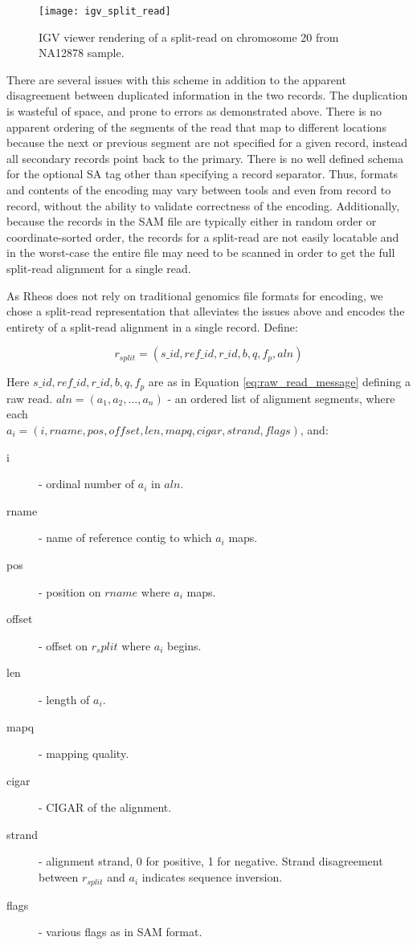\begin{figure}[H]
    \texttt{[image: igv\_split\_read]}
    \centering
    \caption {IGV viewer rendering of a split-read on chromosome 20 from NA12878 sample.}
    \label{fig:igv_split_read}
\end{figure}

There are several issues with this scheme in addition to the apparent disagreement between duplicated information in the two records. The duplication is wasteful of space, and prone to errors as demonstrated above. There is no apparent ordering of the segments of the read that map to different locations because the next or previous segment are not specified for a given record, instead all secondary records point back to the primary. There is no well defined schema for the optional SA tag other than specifying a record separator. Thus, formats and contents of the encoding may vary between tools and even from record to record, without the ability to validate correctness of the encoding. Additionally, because the records in the SAM file are typically either in random order or coordinate-sorted order, the records for a split-read are not easily locatable and in the worst-case the entire file may need to be scanned in order to get the full split-read alignment for a single read. 

As Rheos does not rely on traditional genomics file formats for encoding, we chose a split-read representation that alleviates the issues above and encodes the entirety of a split-read alignment in a single record. Define:

\begin{equation}
    \label{eq:split_read}
    r_{split} = (s\_id, ref\_id, r\_id, b, q, f_p, aln)
\end{equation}

Here $s\_id, ref\_id, r\_id, b, q, f_p$ are as in Equation \ref{eq:raw_read_message} defining a raw read. $aln = (a_1,a_2,...,a_n)$ - an ordered list of alignment segments, where each \\$a_i = (i, rname, pos, offset, len, mapq, cigar, strand, flags)$, and:

\begin{description}
    \item[i] - ordinal number of $a_i$ in $aln$.
    \item[rname] - name of reference contig to which $a_i$ maps.
    \item[pos] - position on $rname$ where $a_i$ maps.
    \item[offset] - offset on $r_split$ where $a_i$ begins.
    \item[len] - length of $a_i$.
    \item[mapq] - mapping quality.
    \item[cigar] - CIGAR of the alignment.
    \item[strand] - alignment strand, 0 for positive, 1 for negative. Strand disagreement between $r_{split}$ and $a_i$ indicates sequence inversion.
    \item[flags] - various flags as in SAM format.   
\end{description}

